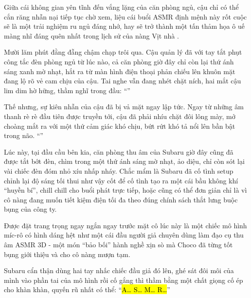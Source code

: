 \documentclass[../main.tex]{subfiles}
\begin{document}
Giữa cái không gian yên tĩnh đến vắng lặng của căn phòng ngủ, cậu chỉ có thể cắn răng nhẫn nại tiếp tục chờ xem, liệu cái buổi ASMR định mệnh này rốt cuộc sẽ là một trải nghiệm ru ngủ đáng nhớ, hay sẽ trở thành một tấn thảm họa ô uế màng nhĩ đáng quên nhất trong lịch sử của nàng Vịt nhà \hll.

\ct

Mười lăm phút đằng đẵng chậm chạp trôi qua. Cậu quản lý đã với tay tắt phụt công tắc đèn phòng ngủ từ lúc nào, cả căn phòng giờ đây chỉ còn lại thứ ánh sáng xanh mờ nhạt, hắt ra từ màn hình điện thoại phản chiếu lên khuôn mặt đang lộ rõ vẻ cam chịu của cậu. Tai nghe vẫn đang nhét chặt ních, hai mắt cậu lim dim hờ hững, thầm nghĩ trong đầu: ``\textit{}''

Thế nhưng, sự kiên nhẫn của cậu đã bị vả mặt ngay lập tức. Ngay từ những âm thanh rè rè đầu tiên được truyền tới, cậu đã phải nhíu chặt đôi lông mày, mở choàng mắt ra với một thứ cảm giác khó chịu, bứt rứt khó tả nổi lên bần bật trong não. ``''

\il

Lúc này, tại đầu cầu bên kia, căn phòng thu âm của Subaru giờ đây cũng đã được tắt bớt đèn, chìm trong một thứ ánh sáng mờ nhạt, ảo diệu, chỉ còn sót lại vài chiếc đèn đóm nhỏ xíu nhấp nháy. Chắc mẩm là Subaru đã cố tình setup chỉnh lại độ sáng tối thui như vậy cốt để cố tình tạo ra một cái bầu không khí ``huyền bí'', chill chill cho buổi phát trực tiếp, hoặc cũng có thể đơn giản chỉ là vì cô nàng đang muốn tiết kiệm điện tối đa theo đúng chính sách thắt lưng buộc bụng của công ty.


Được đặt trang trọng ngay ngắn ngay trước mặt cô lúc này là một chiếc mô hình míc-rô có hình dáng hệt như một cái đầu người giả chuyên dùng làm đạo cụ thu âm ASMR 3D - một món ``bảo bối'' hành nghề xịn sò mà Choco đã từng tốt bụng giới thiệu và cho cô nàng mượn tạm.

Subaru cẩn thận dùng hai tay nhấc chiếc đầu giả đó lên, ghé sát đôi môi của mình vào phần tai của mô hình rồi cố gắng thì thầm bằng một chất giọng cố ép cho khàn khàn, quyến rũ nhất có thể: ``\hl{A\dots{} S\dots{} M\dots{} R\dots}''
\end{document}
